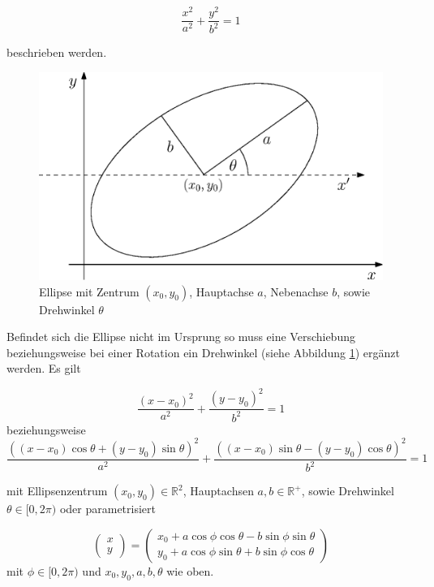 \begin{equation} \label{eq:ellipseNoRotNoTrans}
\frac{x^2}{a^2} + \frac{y^2}{b^2} = 1
\end{equation}

beschrieben werden.

\begin{figure}[!htb]
	\centering
	\includegraphics[scale=.7]{images/ellipse.eps}
	\caption{Ellipse mit Zentrum $(x_0, y_0)$, Hauptachse $a$, Nebenachse $b$, sowie Drehwinkel $\theta$}
	\label{fig:ellipse}
\end{figure}

Befindet sich die Ellipse nicht im Ursprung so muss eine Verschiebung beziehungsweise bei einer Rotation ein Drehwinkel (siehe Abbildung \ref{fig:ellipse}) ergänzt werden. Es gilt

\begin{equation} \label{eq:ellipseNoRotTrans}
\frac{\left(x-x_0\right)^2}{a^2} + \frac{\left(y-y_0\right)^2}{b^2} = 1
\end{equation}
beziehungsweise
\begin{equation} \label{eq:ellipseRotTrans}
\frac{((x - x_0)\cos\theta + (y - y_0)\sin\theta)^2}{a^2} + \frac{((x - x_0)\sin\theta - (y - y_0)\cos\theta)^2}{b^2} = 1
\end{equation}

mit Ellipsenzentrum $(x_0,y_0)\in\mathbb{R}^2$, Hauptachsen $a,b\in\mathbb{R}^+$, sowie Drehwinkel $\theta \in [0,2\pi)$ oder parametrisiert

\begin{equation} \label{eq:ellipseRotTransParam}
\begin{pmatrix}x \\ y\end{pmatrix} = \begin{pmatrix}x_0 + a\cos\phi\cos\theta - b\sin\phi\sin\theta \\
y_0 + a\cos\phi\sin\theta + b\sin\phi\cos\theta\end{pmatrix}
\end{equation}
mit $\phi \in [0, 2\pi)$ und $x_0, y_0, a,b, \theta$ wie oben.

